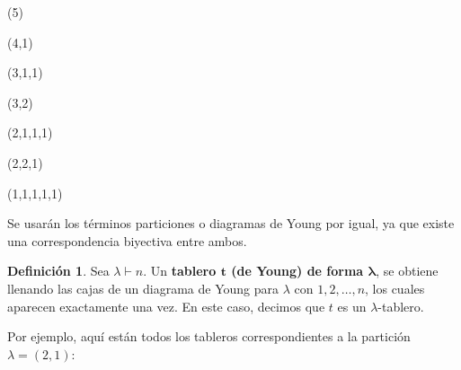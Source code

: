 \documentclass[12pt]{book}
\theoremstyle{definition}
\newtheorem{definition}[theorem]{Definición}
\newcounter{in}
\newcounter{ini}
\begin{document}
\begin{center}
  \begin{minipage}[h]{0.16\linewidth}
    \centering {}\bigskip

    (5)
  \end{minipage}
  \begin{minipage}[h]{0.13\linewidth}
    \centering {}\medskip

    (4,1)
  \end{minipage}
  \begin{minipage}[h]{0.15\linewidth}
    \centering {}\medskip

    (3,1,1)
  \end{minipage}
  \begin{minipage}[h]{0.10\linewidth}
    \centering {}\smallskip

    (3,2)
  \end{minipage}
  \begin{minipage}[h]{0.10\linewidth}
    \centering {}\smallskip

    (2,1,1,1)
  \end{minipage}
  \begin{minipage}[h]{0.10\linewidth}
    \centering {}\smallskip

    (2,2,1)
  \end{minipage}
  \begin{minipage}[h]{0.10\linewidth}
    \centering {}\smallskip

    (1,1,1,1,1)
  \end{minipage}
\end{center}

Se usarán los términos particiones o diagramas de Young por igual, ya
que existe una correspondencia biyectiva entre ambos.
\begin{definition}
  Sea $\lambda\vdash n$. Un \textbf{tablero $\boldsymbol{t}$ (de Young) de forma
    $\boldsymbol{\lambda}$}, se obtiene llenando las cajas de un
  diagrama de Young para $\lambda$ con $1,2,\ldots,n$, los cuales
  aparecen exactamente una vez. En este caso, decimos que $t$ es un
  $\lambda$-tablero.
\end{definition}

Por ejemplo, aquí están todos los tableros correspondientes a la
partición~$\lambda = (2,1)$:
\end{document}
